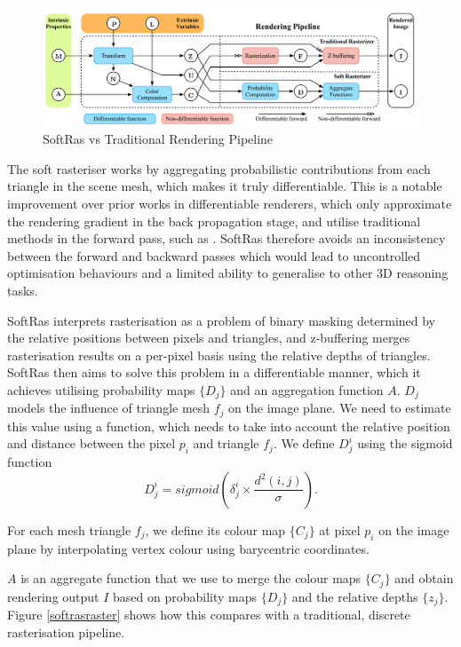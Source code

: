 \documentclass{article}
\begin{document}
\begin{figure}[h!]
  \centering
  \includegraphics[width=\textwidth]{images/softraspipeline.png}
  \caption{SoftRas vs Traditional Rendering Pipeline}
  \label{softraspipe}
\end{figure}

The soft rasteriser works by aggregating probabilistic contributions from each triangle in the scene mesh, which makes it truly differentiable. This is a notable improvement over prior works in differentiable renderers, which only approximate the rendering gradient in the back propagation stage, and utilise traditional methods in the forward pass, such as \cite{neural3dmeshrenderer}. SoftRas therefore avoids an inconsistency between the forward and backward passes which would lead to uncontrolled optimisation behaviours and a limited ability to generalise to other 3D reasoning tasks.

SoftRas interprets rasterisation as a problem of binary masking determined by the relative positions between pixels and triangles, and z-buffering merges rasterisation results on a per-pixel basis using the relative depths of triangles. SoftRas then aims to solve this problem in a differentiable manner, which it achieves utilising probability maps $\{D_j\}$ and an aggregation function $A$. $D_j$ models the influence of triangle mesh $f_j$ on the image plane. We need to estimate this value using a function, which needs to take into account the relative position and distance between the pixel $p_i$ and triangle $f_j$. We define $D_j^i$ using the sigmoid function \[D^i_j = sigmoid(\delta^i_j \times \frac{d^2(i,j)}{\sigma})\text{.}\]

For each mesh triangle $f_j$, we define its colour map $\{C_j\}$ at pixel $p_i$ on the image plane by interpolating vertex colour using barycentric coordinates.

$A$ is an aggregate function that we use to merge the colour maps $\{C_j\}$ and obtain rendering output $I$ based on probability maps $\{D_j\}$ and the relative depths $\{z_j\}$. Figure \ref{softrasraster} shows how this compares with a traditional, discrete rasterisation pipeline.
\end{document}

